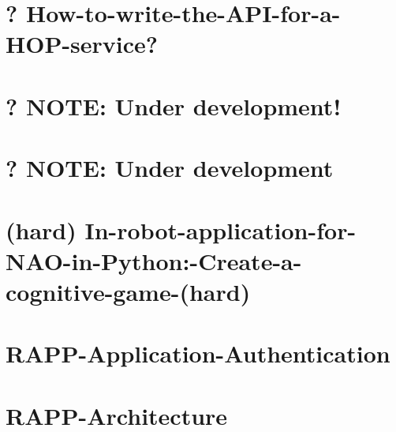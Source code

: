 \documentclass[twoside]{book}
\begin{document}
\chapter{? How-\/to-\/write-\/the-\/\-A\-P\-I-\/for-\/a-\/\-H\-O\-P-\/service?}
\label{md_rapp-platform_8wiki_How-to-write-the-API-for-a-HOP-service}
\hypertarget{md_rapp-platform_8wiki_How-to-write-the-API-for-a-HOP-service}{}

\chapter{? N\-O\-T\-E\-: Under development!}
\label{md_rapp-platform_8wiki_I-do-not-even-want-to-try-the-easier-way_8-Do-you-have-something-up-and-running-to-test}
\hypertarget{md_rapp-platform_8wiki_I-do-not-even-want-to-try-the-easier-way_8-Do-you-have-something-up-and-running-to-test}{}

\chapter{? N\-O\-T\-E\-: Under development}
\label{md_rapp-platform_8wiki_I-do-not-want-to-install-RAPP-Platform_8-Is-there-an-easier-way-to-use-it}
\hypertarget{md_rapp-platform_8wiki_I-do-not-want-to-install-RAPP-Platform_8-Is-there-an-easier-way-to-use-it}{}

\chapter{(hard) In-\/robot-\/application-\/for-\/\-N\-A\-O-\/in-\/\-Python\-:-\/\-Create-\/a-\/cognitive-\/game-\/(hard)}
\label{md_rapp-platform_8wiki_In-robot-application-for-NAO-in-Python_1-Create-a-cognitive-game-}
\hypertarget{md_rapp-platform_8wiki_In-robot-application-for-NAO-in-Python_1-Create-a-cognitive-game-}{}

\chapter{R\-A\-P\-P-\/\-Application-\/\-Authentication}
\label{md_rapp-platform_8wiki_RAPP-Application-Authentication}
\hypertarget{md_rapp-platform_8wiki_RAPP-Application-Authentication}{}

\chapter{R\-A\-P\-P-\/\-Architecture}
\label{md_rapp-platform_8wiki_RAPP-Architecture}
\hypertarget{md_rapp-platform_8wiki_RAPP-Architecture}{}

\end{document}

